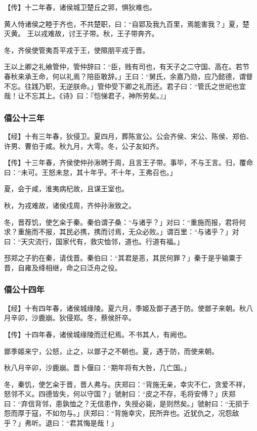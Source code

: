 \documentclass[]{article}
\begin{document}
【传】十二年春，诸侯城卫楚丘之郛，惧狄难也。

黄人恃诸侯之睦于齐也，不共楚职，曰：``自郢及我九百里，焉能害我？」夏，楚灭黄。
王以戎难故，讨王子带。秋，王子带奔齐。

冬，齐侯使管夷吾平戎于王，使隰朋平戎于晋。

王以上卿之礼飨管仲，管仲辞曰：``臣，贱有司也，有天子之二守国、高在。若节春秋来承王命，何以礼焉？陪臣敢辞。」王曰：``舅氏，余嘉乃勋，应乃懿德，谓督不忘。往践乃职，无逆朕命。」管仲受下卿之礼而还。君子曰：``管氏之世祀也宜哉！让不忘其上。《诗》曰：『恺悌君子，神所劳矣。』」

\hypertarget{header-n779}{%
\subsubsection{僖公十三年}\label{header-n779}}

【经】十有三年春，狄侵卫。夏四月，葬陈宣公。公会齐侯、宋公、陈侯、郑伯、许男、曹伯于咸。秋九月，大雩。冬，公子友如齐。

【传】十三年春，齐侯使仲孙湫聘于周，且言王子带。事毕，不与王言。归，覆命曰：``未可。王怒未怠，其十年乎。不十年，王弗召也。」

夏，会于咸，淮夷病杞故，且谋王室也。

秋，为戎难故，诸侯戍周，齐仲孙湫致之。

冬，晋荐饥，使乞籴于秦。秦伯谓子桑：``与诸乎？」对曰：``重施而报，君将何求？重施而不报，其民必携，携而讨焉，无众必败。」谓百里：``与诸乎？」对曰：``天灾流行，国家代有，救灾恤邻，道也。行道有福。」

邳郑之子豹在秦，请伐晋。秦伯曰：``其君是恶，其民何罪？」秦于是乎输粟于晋，自雍及绛相继，命之曰泛舟之役。

\hypertarget{header-n788}{%
\subsubsection{僖公十四年}\label{header-n788}}

【经】十有四年春，诸侯城缘陵。夏六月，季姬及鄫子遇于防。使鄫子来朝。秋八月辛卯，沙鹿崩。狄侵郑。冬，蔡侯肝卒。

【传】十四年春，诸侯城缘陵而迁杞焉。不书其人，有阙也。

鄫季姬来宁，公怒，止之，以鄫子之不朝也。夏，遇于防，而使来朝。

秋八月辛卯，沙鹿崩。晋卜偃曰：``期年将有大咎，几亡国。」

冬，秦饥，使乞籴于晋，晋人弗与。庆郑曰：``背施无亲，幸灾不仁，贪爱不祥，怒邻不义。四德皆失，何以守国？」虢射曰：``皮之不存，毛将安傅？」庆郑曰：``弃信背邻，患孰恤之？无信患作，失授必毙，是则然矣。」虢射曰：``无损于怨而厚于寇，不如勿与。」庆郑曰：``背施幸灾，民所弃也。近犹仇之，况怨敌乎？」弗听。退曰：``君其悔是哉！」
\end{document}

